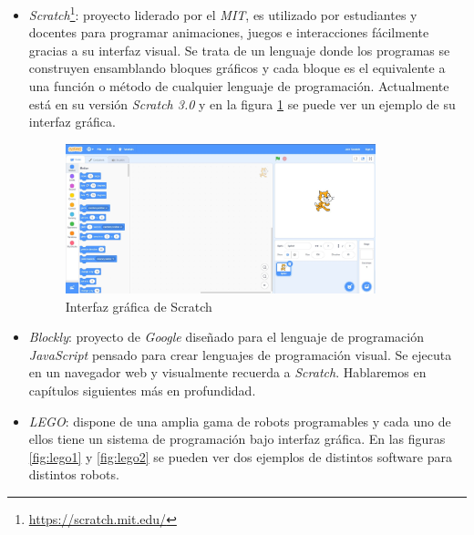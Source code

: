 \begin{itemize}
    \item \textit{Scratch}\footnote{\url{https://scratch.mit.edu/}}: proyecto liderado por el \textit{MIT}, es utilizado por estudiantes y docentes para programar animaciones, juegos e interacciones fácilmente gracias a su interfaz visual. Se trata de un lenguaje donde los programas se construyen ensamblando bloques gráficos y cada bloque es el equivalente a una función o método de cualquier lenguaje de programación. Actualmente está en su versión \textit{Scratch 3.0} y en la figura \ref{fig:scratch} se puede ver un ejemplo de su interfaz gráfica. 
    \begin{figure}[H]
    \centering
    \includegraphics[width=0.85\textwidth]{img/scratch.jpg}
    \caption{Interfaz gráfica de Scratch} \label{fig:scratch}
    \end{figure}
    
    \item \textit{Blockly}: proyecto de \textit{Google} diseñado para el lenguaje de programación \textit{JavaScript} pensado para crear lenguajes de programación visual. Se ejecuta en un navegador web y visualmente recuerda a \textit{Scratch}. Hablaremos en capítulos siguientes más en profundidad. 
    
    \item \textit{LEGO}: dispone de una amplia gama de robots programables y cada uno de ellos tiene un sistema de programación bajo interfaz gráfica. En las figuras \ref{fig:lego1} y \ref{fig:lego2} se pueden ver dos ejemplos de distintos software para distintos robots.  
    

\end{itemize}
